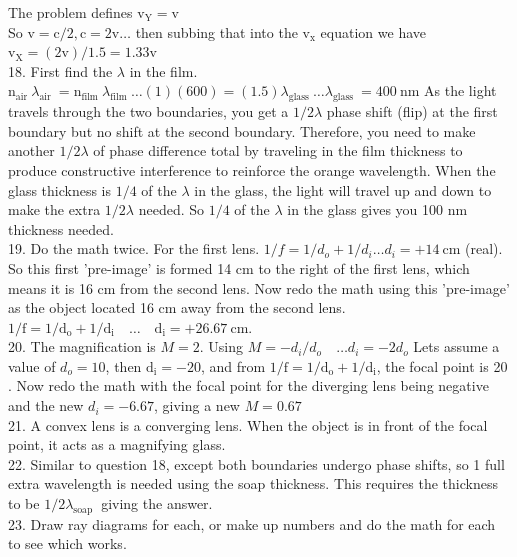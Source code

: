 \begin{enumerate}
The problem defines $\mathrm{v}_{\mathrm{Y}}=\mathrm{v}$\\
So $\mathrm{v}=\mathrm{c} / 2, \mathrm{c}=2 \mathrm{v} \ldots$ then subbing that into the $\mathrm{v}_{\mathrm{x}}$ equation we have $\mathrm{v}_{\mathrm{X}}=(2 \mathrm{v}) / 1.5=1.33 \mathrm{v}$\\
18. First find the $\lambda$ in the film. $\mathrm{n}_{\text {air }} \lambda_{\text {air }}=\mathrm{n}_{\text {film }} \lambda_{\text {film }} \ldots(1)(600)=(1.5) \lambda_{\text {glass }} \ldots \lambda_{\text {glass }}=400 \mathrm{~nm}$ As the light travels through the two boundaries, you get a $1 / 2 \lambda$ phase shift (flip) at the first boundary but no shift at the second boundary. Therefore, you need to make another $1 / 2 \lambda$ of phase difference total by traveling in the film thickness to produce constructive interference to reinforce the orange wavelength. When the glass thickness is $1 / 4$ of the $\lambda$ in the glass, the light will travel up and down to make the extra $1 / 2 \lambda$ needed. So $1 / 4$ of the $\lambda$ in the glass gives you 100 nm thickness needed.\\
19. Do the math twice. For the first lens. $1 / f=1 / d_{o}+1 / d_{i} \ldots d_{i}=+14 \mathrm{~cm}$ (real). So this first 'pre-image' is formed 14 cm to the right of the first lens, which means it is 16 cm from the second lens. Now redo the math using this 'pre-image' as the object located 16 cm away from the second lens. $1 / \mathrm{f}=1 / \mathrm{d}_{\mathrm{o}}+1 / \mathrm{d}_{\mathrm{i}} \quad \ldots \quad \mathrm{d}_{\mathrm{i}}=+26.67 \mathrm{~cm}$.\\
20. The magnification is $M=2$. Using $M=-d_{i} / d_{o} \quad \ldots d_{i}=-2 d_{o}$ Lets assume a value of $d_{o}=10$, then $\mathrm{d}_{\mathrm{i}}=-20$, and from $1 / \mathrm{f}=1 / \mathrm{d}_{\mathrm{o}}+1 / \mathrm{d}_{\mathrm{i}}$, the focal point is 20 . Now redo the math with the focal point for the diverging lens being negative and the new $d_{i}=-6.67$, giving a new $M=0.67$\\
21. A convex lens is a converging lens. When the object is in front of the focal point, it acts as a magnifying glass.\\
22. Similar to question 18, except both boundaries undergo phase shifts, so 1 full extra wavelength is needed using the soap thickness. This requires the thickness to be $1 / 2 \lambda_{\text {soap }}$ giving the answer.\\
23. Draw ray diagrams for each, or make up numbers and do the math for each to see which works.\\

\end{enumerate}
